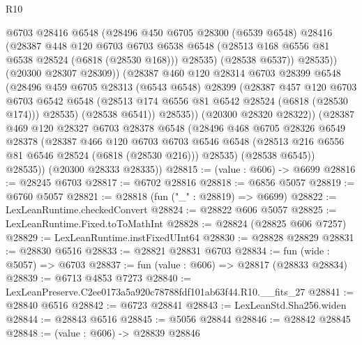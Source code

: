 \begin{lexlean}{R10}
\begin{coremodule}
                  @6703
                  @28416
                  @6548
                  (@28496
                    @450
                    @6705
                    @28300
                    (@6539 @6548)
                    @28416
                    (@28387
                      @448
                      @120
                      @6703
                      @6703
                      @6538
                      @6548
                      (@28513 @168 @6556 @81 @6538 @28524 (@6818 (@28530 @168)))
                      @28535)
                    (@28538 @6537))
                  @28535))
              (@20300 @28307 @28309))
            (@28387
              @460
              @120
              @28314
              @6703
              @28399
              @6548
              (@28496
                @459
                @6705
                @28313
                (@6543 @6548)
                @28399
                (@28387
                  @457
                  @120
                  @6703
                  @6703
                  @6542
                  @6548
                  (@28513 @174 @6556 @81 @6542 @28524 (@6818 (@28530 @174)))
                  @28535)
                (@28538 @6541))
              @28535))
          (@20300 @28320 @28322))
        (@28387
          @469
          @120
          @28327
          @6703
          @28378
          @6548
          (@28496
            @468
            @6705
            @28326
            @6549
            @28378
            (@28387
              @466
              @120
              @6703
              @6703
              @6546
              @6548
              (@28513 @216 @6556 @81 @6546 @28524 (@6818 (@28530 @216)))
              @28535)
            (@28538 @6545))
          @28535))
      (@20300 @28333 @28335))
@28815 := (value : @606) -> @6699
@28816 := @28245 @6703
@28817 := @6702 @28816
@28818 := @6856 @5057
@28819 := @6760 @5057
@28821 := @28818 (fun ("_" : @28819) => @6699)
@28822 := LexLeanRuntime.checkedConvert
@28824 := @28822 @606 @5057
@28825 := LexLeanRuntime.Fixed.toToMathInt
@28828 := @28824 (@28825 @606 @7257)
@28829 := LexLeanRuntime.instFixedUInt64
@28830 := @28828 @28829
@28831 := @28830 @6516
@28833 := @28821 @28831 @6703
@28834 := fun (wide : @5057) => @6703
@28837 := fun (value : @606) => @28817 (@28833 @28834)
@28839 := @6713 @4853 @7273
@28840 := LexLeanPreserve.C2ee0173a5a920c78788fdf101ab63f44.R10.__fits_27
@28841 := @28840 @6516
@28842 := @6723 @28841
@28843 := LexLeanStd.Sha256.widen
@28844 := @28843 @6516
@28845 := @5056 @28844
@28846 := @28842 @28845
@28848 := (value : @606) -> @28839 @28846

\end{coremodule}
\end{lexlean}
